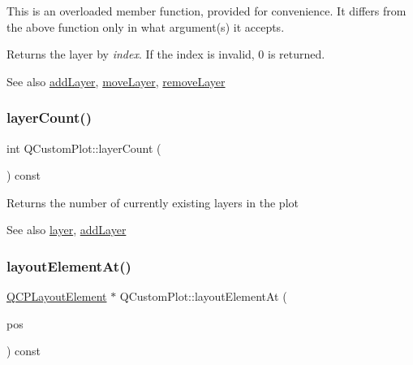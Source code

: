 This is an overloaded member function, provided for convenience. It differs from the above function only in what argument(s) it accepts.

Returns the layer by {\itshape index}. If the index is invalid, 0 is returned.

\begin{DoxySeeAlso}{See also}
\mbox{\hyperlink{class_q_custom_plot_ad5255393df078448bb6ac83fa5db5f52}{add\+Layer}}, \mbox{\hyperlink{class_q_custom_plot_ae896140beff19424e9e9e02d6e331104}{move\+Layer}}, \mbox{\hyperlink{class_q_custom_plot_a40f75e342c5eaab6a86066a42a0e2a94}{remove\+Layer}} 
\end{DoxySeeAlso}
\mbox{\label{class_q_custom_plot_afa45d61e65292026f4c58c9c88c2cef0}} 
\subsubsection{\texorpdfstring{layer\+Count()}{layerCount()}}
{\footnotesize\ttfamily int Q\+Custom\+Plot\+::layer\+Count (\begin{DoxyParamCaption}{ }\end{DoxyParamCaption}) const}

Returns the number of currently existing layers in the plot

\begin{DoxySeeAlso}{See also}
\mbox{\hyperlink{class_q_custom_plot_a0a96244e7773b242ef23c32b7bdfb159}{layer}}, \mbox{\hyperlink{class_q_custom_plot_ad5255393df078448bb6ac83fa5db5f52}{add\+Layer}} 
\end{DoxySeeAlso}
\mbox{\label{class_q_custom_plot_afaa1d304e0287d140fd238e90889ef3c}} 
\subsubsection{\texorpdfstring{layout\+Element\+At()}{layoutElementAt()}}
{\footnotesize\ttfamily \mbox{\hyperlink{class_q_c_p_layout_element}{Q\+C\+P\+Layout\+Element}} $\ast$ Q\+Custom\+Plot\+::layout\+Element\+At (\begin{DoxyParamCaption}\item[{const Q\+PointF \&}]{pos }\end{DoxyParamCaption}) const}

